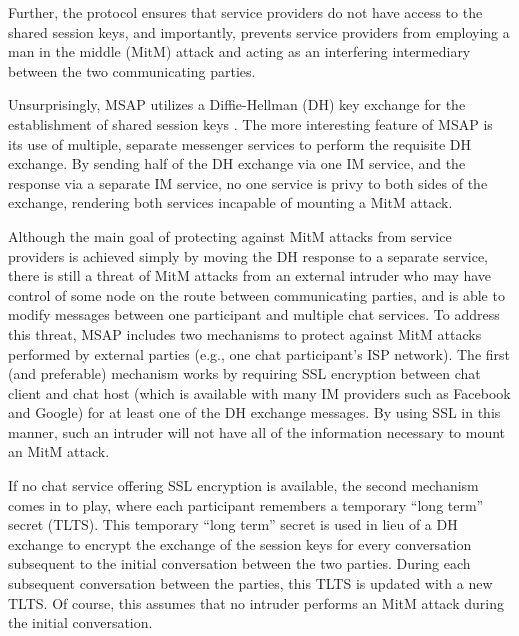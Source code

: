 \documentclass[twoside,10pt]{article}
\begin{document}
\begin{multicols}{2}
Further, the protocol ensures that service providers do not have access to the shared session keys, and importantly, prevents service providers from employing a man in the middle (MitM) attack and acting as an interfering intermediary between the two communicating parties.

Unsurprisingly, MSAP utilizes a Diffie-Hellman (DH) key exchange for the establishment of shared session keys \cite{diffie1976new}.  The more interesting feature of MSAP is its use of multiple, separate messenger services to perform the requisite DH exchange.  By sending half of the DH exchange via one IM service, and the response via a separate IM service, no one service is privy to both sides of the exchange, rendering both services incapable of mounting a MitM attack.

Although the main goal of protecting against MitM attacks from service providers is achieved simply by moving the DH response to a separate service, there is still a threat of MitM attacks from an external intruder who may have control of some node on the route between communicating parties, and is able to modify messages between one participant and multiple chat services. To address this threat, MSAP includes two mechanisms to protect against MitM attacks performed by external parties (e.g., one chat participant's ISP network).  The first (and preferable) mechanism works by requiring SSL encryption between chat client and chat host (which is available with many IM providers such as Facebook and Google) for at least one of the DH exchange messages.  By using SSL in this manner, such an intruder will not have all of the information necessary to mount an MitM attack.

If no chat service offering SSL encryption is available, the second mechanism comes in to play, where each participant remembers a temporary ``long term'' secret (TLTS).  This temporary ``long term'' secret is used in lieu of a DH exchange to encrypt the exchange of the session keys for every conversation subsequent to the initial conversation between the two parties.  During each subsequent conversation between the parties, this TLTS is updated with a new TLTS.  Of course, this assumes that no intruder performs an MitM attack during the initial conversation.


\end{multicols}
\end{document}
